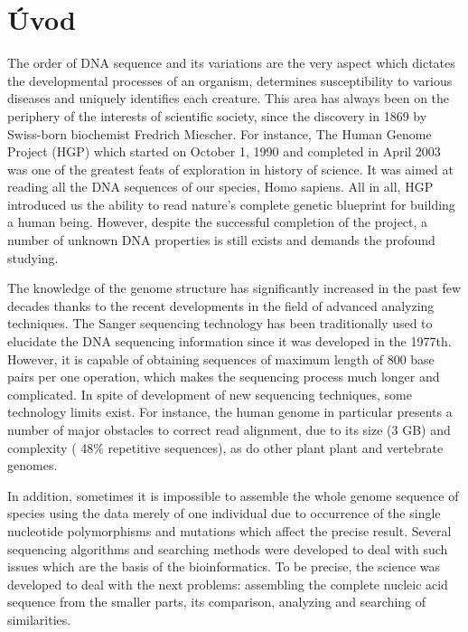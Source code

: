 
{}

\chapter*{Úvod}

\par The order of DNA sequence and its variations are the very aspect which dictates the developmental processes of an organism, 
determines susceptibility to various diseases and uniquely identifies each creature. This area has always been on the periphery 
of the interests of scientific society, since the discovery in 1869 by Swiss-born biochemist Fredrich Miescher. 
For instance, The Human Genome Project (HGP) which started on October 1, 1990 and completed in April 2003 was one of the greatest feats 
of exploration in history of science. It was aimed at reading all the DNA sequences of our species, Homo sapiens. All in all, 
HGP introduced us the ability to read nature's complete genetic blueprint for building a human being. However, despite the successful 
completion of the project, a number of unknown DNA properties is still exists and demands the profound studying.

The knowledge of the genome structure has significantly increased in the past few decades thanks to the recent developments in the 
field of advanced analyzing techniques. The Sanger sequencing technology has been traditionally used to elucidate the DNA sequencing 
information since it was developed in the 1977th. However, it is capable of obtaining sequences of maximum length of 800 base pairs per one 
operation, which makes the sequencing process much longer and complicated. In spite of development of new sequencing techniques, 
some technology limits exist. For instance, the human genome in particular presents a number of major obstacles to correct read alignment, 
due to its size (3 GB) and complexity ( 48\% repetitive sequences), as do other plant plant and vertebrate genomes.

In addition, sometimes it is impossible to assemble the whole genome sequence of species using the data merely of one individual due to 
occurrence of the single nucleotide polymorphisms and mutations which affect the precise result. Several sequencing algorithms and searching 
methods were developed to deal with such issues which are the basis of the bioinformatics. To be precise, the science was developed to deal with 
the next problems: assembling the complete nucleic acid sequence from the smaller parts, its comparison, analyzing and searching of similarities.

